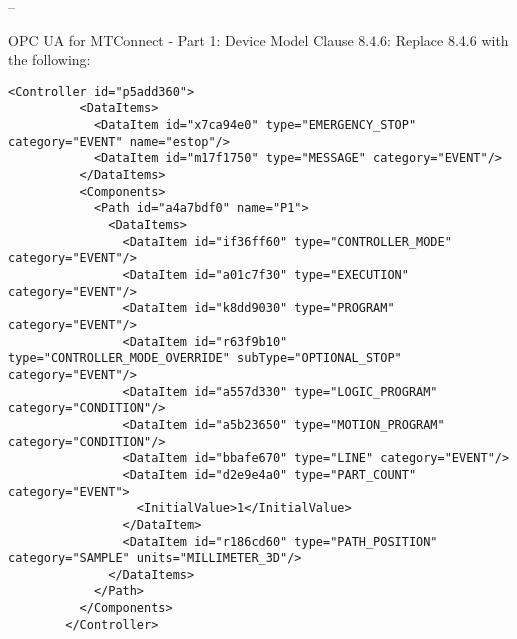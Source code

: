 \documentclass{mtc-opc}	%
\begin{document}


\glsresetall
{}

\clearpage

\begin{center}
  \large{\getdocnum \space -- \getdoctitleshort}
  
  \large{\getdoctitlepart}
  
  \large{\gettitledesc}
\end{center}

\begin{mdframed}[linecolor=black,backgroundcolor=gray!30]
  OPC UA for MTConnect - Part 1: Device Model\newline
  Clause 8.4.6: Replace 8.4.6 with the following:
\end{mdframed}

\setcounter{lstlisting}{6}

\begin{lstlisting}[firstnumber=last,%
    caption={Controller and Path Components and Their Data Items},label={lst:controller-component}]
        <Controller id="p5add360">
          <DataItems>
            <DataItem id="x7ca94e0" type="EMERGENCY_STOP" category="EVENT" name="estop"/>
            <DataItem id="m17f1750" type="MESSAGE" category="EVENT"/>
          </DataItems>
          <Components>
            <Path id="a4a7bdf0" name="P1">
              <DataItems>
                <DataItem id="if36ff60" type="CONTROLLER_MODE" category="EVENT"/>
                <DataItem id="a01c7f30" type="EXECUTION" category="EVENT"/>
                <DataItem id="k8dd9030" type="PROGRAM" category="EVENT"/>
                <DataItem id="r63f9b10" type="CONTROLLER_MODE_OVERRIDE" subType="OPTIONAL_STOP" category="EVENT"/>
                <DataItem id="a557d330" type="LOGIC_PROGRAM" category="CONDITION"/>
                <DataItem id="a5b23650" type="MOTION_PROGRAM" category="CONDITION"/>
                <DataItem id="bbafe670" type="LINE" category="EVENT"/>
                <DataItem id="d2e9e4a0" type="PART_COUNT" category="EVENT">
                  <InitialValue>1</InitialValue>
                </DataItem>
                <DataItem id="r186cd60" type="PATH_POSITION" category="SAMPLE" units="MILLIMETER_3D"/>
              </DataItems>
            </Path>
          </Components>
        </Controller>
\end{lstlisting}

\setcounter{section}{8}
\setcounter{subsection}{4}
\setcounter{subsubsection}{5}
\setcounter{lstlisting}{9}
\setcounter{figure}{29}
\setcounter{table}{11}
\end{document}
